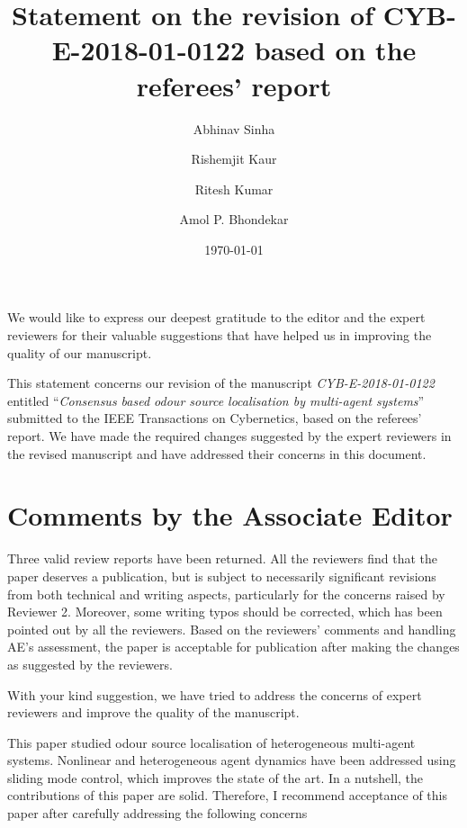 \documentclass[10pt]{article}
\title{Statement on the revision of \textsc{CYB-E-2018-01-0122} based on the referees' report}
\author{Abhinav Sinha \and Rishemjit Kaur \and Ritesh Kumar \and Amol P. Bhondekar}
\date{\today}
\newcommand\PaperTitle[1]{``\textit{#1}''}
\begin{document}
We would like to express our deepest gratitude to the editor and the expert reviewers for their valuable suggestions that have helped us in improving the quality of our manuscript.\medskip

\noindent This statement concerns our revision of the manuscript \emph{CYB-E-2018-01-0122} entitled \PaperTitle{Consensus based odour source localisation by multi-agent systems} submitted to the IEEE Transactions on Cybernetics, based on the referees' report. We have made the required changes suggested by the expert reviewers in the revised manuscript and have addressed their concerns in this document.

\section*{Comments by the Associate Editor}
\begin{response}{Three valid review reports have been returned. All the reviewers find that the paper deserves a publication, but is subject to necessarily significant revisions from both technical and writing aspects, particularly for the concerns raised by Reviewer 2. Moreover, some writing typos should be corrected, which has been pointed out by all the reviewers. Based on the reviewers’ comments and handling AE’s assessment, the paper is acceptable for publication after making the changes as suggested by the reviewers.}

With your kind suggestion, we have tried to address the concerns of expert reviewers and improve the quality of the manuscript.

\end{response}


This paper studied odour source localisation of heterogeneous multi-agent systems. Nonlinear and heterogeneous agent dynamics have been addressed using sliding mode control, which improves the state of the art. In a nutshell, the contributions of this paper are solid. Therefore, I recommend acceptance of this paper after carefully addressing the following concerns
\end{document}
